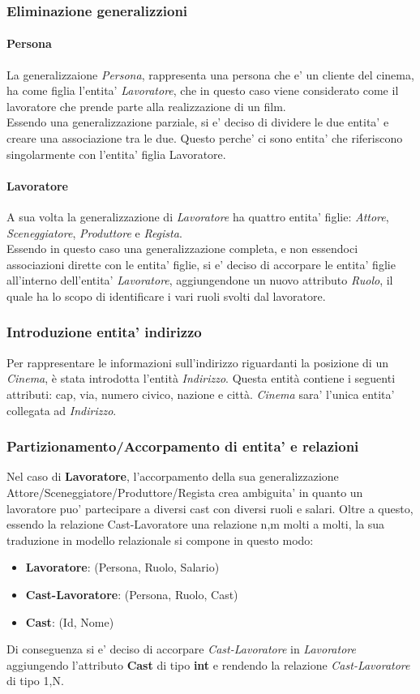 \documentclass[10pt]{article}
\begin{document}
	\subsubsection{Eliminazione generalizzioni}
	\paragraph{Persona}
	La generalizzaione \textit{Persona}, rappresenta una persona che e' un cliente del cinema, ha come figlia l'entita' \textit{Lavoratore}, che in questo caso viene considerato come il lavoratore che prende parte alla realizzazione di un film.\\
	Essendo una generalizzazione parziale, si e' deciso di dividere le due entita' e creare una associazione tra le due. Questo perche' ci sono entita' che riferiscono singolarmente con l'entita' figlia Lavoratore.
	\paragraph{Lavoratore}
	A sua volta la generalizzazione di \textit{Lavoratore} ha quattro entita' figlie: \textit{Attore}, \textit{Sceneggiatore}, \textit{Produttore} e \textit{Regista}.\\
	Essendo in questo caso una generalizzazione completa, e non essendoci associazioni dirette con le entita' figlie, si e' deciso di accorpare le entita' figlie all'interno dell'entita' \textit{Lavoratore}, aggiungendone un nuovo attributo \textit{Ruolo}, il quale ha lo scopo di identificare i vari ruoli svolti dal lavoratore.
	\subsubsection{Introduzione entita' indirizzo}
	Per rappresentare le informazioni sull’indirizzo riguardanti la posizione di un \textit{Cinema}, è stata introdotta l’entità \textit{Indirizzo}. Questa entità contiene i seguenti attributi: cap, via, numero civico, nazione e città. \textit{Cinema} sara' l'unica entita' collegata ad \textit{Indirizzo}.
	\subsubsection{Partizionamento/Accorpamento di entita' e relazioni}
	Nel caso di \textbf{Lavoratore}, l'accorpamento della sua generalizzazione Attore/Sceneggiatore/Produttore/Regista crea ambiguita' in quanto un lavoratore puo' partecipare a diversi cast con diversi ruoli e salari. Oltre a questo, essendo la relazione Cast-Lavoratore una relazione n,m molti a molti, la sua traduzione in modello relazionale si compone in questo modo:\\
	\begin{itemize}
		\item \textbf{Lavoratore}: (Persona, Ruolo, Salario)
		\item \textbf{Cast-Lavoratore}: (Persona, Ruolo, Cast)
		\item \textbf{Cast}: (Id, Nome)
	\end{itemize}
	Di conseguenza si e' deciso di accorpare \textit{Cast-Lavoratore} in \textit{Lavoratore} aggiungendo l'attributo \textbf{Cast} di tipo \textbf{int} e rendendo la relazione \textit{Cast-Lavoratore} di tipo 1,N.
\end{document}
